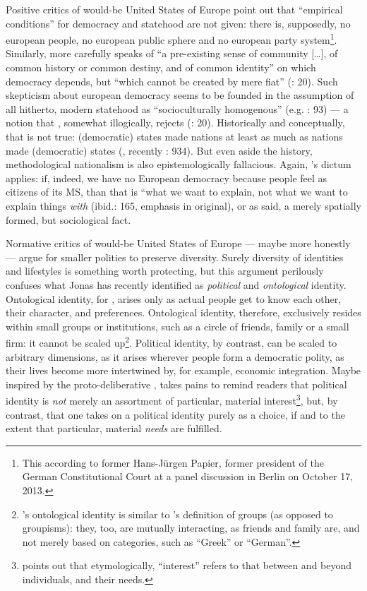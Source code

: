 \documentclass[11pt,a4paper,oneside,openright]{article}
\begin{document}
Positive critics of would-be United States of Europe point out that ``empirical conditions'' for democracy and statehood are not given: there is, supposedly, no european people, no european public sphere and no european party system\footnote{
	This according to former Hans-J\"{u}rgen Papier, former president of the German Constitutional Court at a panel discussion in Berlin on October 17, 2013.}.
Similarly, \citeauthor{Scharpf1997} more carefully 	speaks of ``a pre-existing sense of community [\ldots], of common history or common destiny, and of common identity'' on which democracy depends, but ``which cannot be created by mere fiat'' (\citeyear{Scharpf1997}: 20).
Such skepticism about european democracy seems to be founded in the assumption of all hitherto, modern statehood as ``socioculturally homogenous'' (e.g. \citealt{BeckGrande-2007-aa}: 93) --- a notion that \citeauthor{Scharpf1997}, somewhat illogically, rejects (\citeyear{Scharpf1997}: 20). Historically and conceptually, that is not true: (democratic) states made nations at least as much as nations made (democratic) states (\citealt{Gellner-1983-aa}, recently \citealt{Schmitter1999}: 934). But even aside the history, methodological nationalism is also epistemologically fallacious. Again, \citeauthor{Brubaker-2002-aa}'s dictum applies: if, indeed, we have no European democracy because people feel as citizens of its \gls{MS}, than that is ``what we want to explain, not what we want to explain things \emph{with} (ibid.: 165, emphasis in original), or as \citeauthor{Simmel1903} said, a merely spatially formed, but sociological fact.

Normative critics of would-be United States of Europe --- maybe more honestly --- argue for smaller polities to preserve diversity. Surely diversity of identities and lifestyles is something worth protecting, but this argument perilously confuses what Jonas \cite{Marx2012} has recently identified as \emph{political} and \emph{ontological} identity. Ontological identity, for \citeauthor{Marx2012}, arises only as actual people get to know each other, their character, and preferences. Ontological identity, therefore, exclusively resides within small groups or institutions, such as a circle of friends, family or a small firm: it cannot be scaled up\footnote{
	\cite{Marx2012}'s ontological identity is similar to \cite{Brubaker-2002-aa}'s definition of groups (as opposed to groupisms): they, too, are mutually interacting, as friends and family are, and not merely based on categories, such as ``Greek'' or ``German''.}.
Political identity, by contrast, can be scaled to arbitrary dimensions, as it arises wherever people form a democratic polity, as their lives become more intertwined by, for example, economic integration. Maybe inspired by the proto-deliberative \cite{Ahrendt1958}, \citeauthor{Marx2012} takes pains to remind readers that political identity is \emph{not} merely an assortment of particular, material interest\footnote{
	\citeauthor{Marx2012} points out that etymologically, ``interest'' refers to that between and beyond individuals, and their needs.}, 
but, by contrast, that one takes on a political identity purely as a choice, if and to the extent that particular, material \emph{needs} are fulfilled. 
\end{document}
